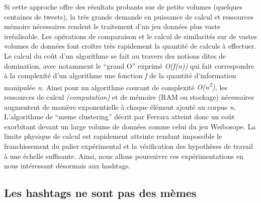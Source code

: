Si cette approche offre des résultats probants sur de petits volumes (quelques centaines de tweets), la très grande demande en puissance de calcul et ressources mémoire nécessaires rendent le traitement d{\textquoteright}un jeu données plus vaste irréalisable. Les opérations de comparaison et le calcul de similarités sur de vastes volumes de données font cro\^itre très rapidement la quantité de calculs à effectuer. Le calcul du co\^ut d{\textquoteright}un algorithme se fait au travers des notions dites de domination, avec notamment le {\textquotedblleft}grand O{\textquotedblright} exprimé \textit{O(f(n)) }qui fait correspondre à la complexité d{\textquoteright}un algorithme une fonction \textit{f} de la quantité d{\textquoteright}information manipulée \textit{n. }Ainsi pour un algorithme courant de complexité \textit{O(n}\textit{\textsuperscript{2}}\textit{), }les ressources de calcul \textit{(computation)} et de mémoire (RAM ou stockage) nécessaires augmentent de manière exponentielle à chaque élément ajouté au corpus \textit{n}. L{\textquoteright}algorithme de {\textquotedblleft}meme clustering{\textquotedblright} décrit par Ferrara atteint donc un co\^ut exorbitant devant un large volume de données comme celui du jeu Weibosope. La limite physique de calcul est rapidement atteinte rendant impossible le franchissement du palier expérimental et la vérification des hypothèses de travail à une échelle suffisante. Ainsi, nous allons poursuivre ces expérimentations en nous intéressant désormais aux hashtags.

\subsection[Les hashtags ne sont pas des mèmes]{Les hashtags ne sont pas des mèmes}
\label{sec:hashtags}

